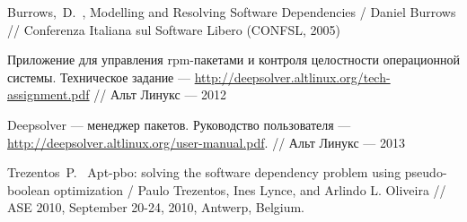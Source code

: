Burrows,~D.~,
Modelling and Resolving Software Dependencies /
Daniel Burrows //
Conferenza Italiana sul Software Libero (CONFSL, 2005)

Приложение для управления rpm-пакетами и контроля целостности операционной системы. Техническое задание 
--- \url{http://deepsolver.altlinux.org/tech-assignment.pdf} // Альт Линукс --- 2012

Deepsolver --- менеджер пакетов. Руководство пользователя
--- \url{http://deepsolver.altlinux.org/user-manual.pdf}. // Альт Линукс --- 2013

Trezentos~P.~
Apt-pbo: solving the software dependency problem using pseudo-boolean optimization /
Paulo Trezentos, Ines Lynce, and Arlindo L. Oliveira //
ASE 2010, September 20-24, 2010, Antwerp, Belgium.

